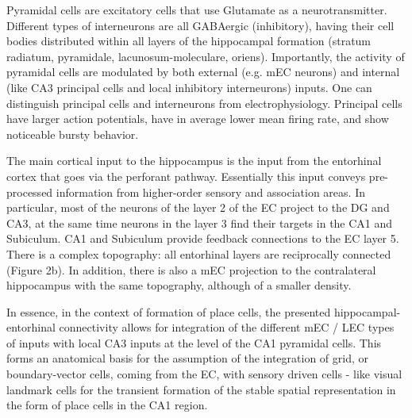 Pyramidal cells are excitatory cells that use Glutamate as a neurotransmitter. Different types of interneurons are all GABAergic (inhibitory), having their cell bodies distributed within all layers of the hippocampal formation (stratum radiatum, pyramidale, lacunosum-moleculare, oriens). Importantly, the activity of pyramidal cells are modulated by both external (e.g. mEC neurons) and internal (like CA3 principal cells and local inhibitory interneurons) inputs. One can distinguish principal cells and interneurons from electrophysiology. Principal cells have larger action potentials, have in average lower mean firing rate, and show noticeable bursty behavior.

The main cortical input to the hippocampus is the input from the entorhinal cortex that goes via the perforant pathway. Essentially this input conveys pre-processed information from higher-order sensory and association areas. In particular, most of the neurons of the layer 2 of the EC project to the DG and CA3, at the same time neurons in the layer 3 find their targets in the CA1 and Subiculum. CA1 and Subiculum provide feedback connections to the EC layer 5. There is a complex topography: all entorhinal layers are reciprocally connected (Figure 2b). In addition, there is also a mEC projection to the contralateral hippocampus with the same topography, although of a smaller density.

In essence, in the context of formation of place cells, the presented hippocampal-entorhinal connectivity allows for integration of the different mEC / LEC types of inputs with local CA3 inputs at the level of the CA1 pyramidal cells. This forms an anatomical basis for the assumption of the integration of grid, or boundary-vector cells, coming from the EC, with sensory driven cells - like visual landmark cells for the transient formation of the stable spatial representation in the form of place cells in the CA1 region.


